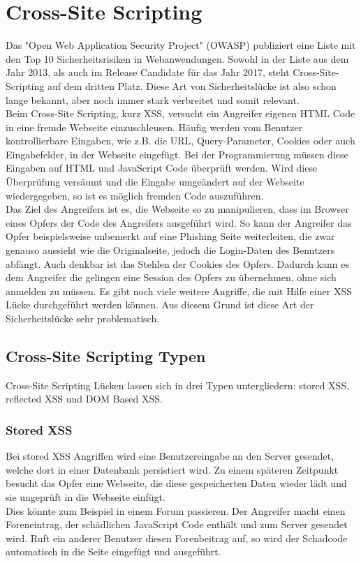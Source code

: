 \section{Cross-Site Scripting}
Das "Open Web Application Security Project" (OWASP) publiziert eine Liste mit den Top 10 Sicherheitsrisiken in Webanwendungen. Sowohl in der Liste aus dem Jahr 2013, als auch im Release Candidate für das Jahr 2017, steht Cross-Site-Scripting auf dem dritten Platz. Diese Art von Sicherheitslücke ist also schon lange bekannt, aber noch immer stark verbreitet und somit relevant. \\
Beim Cross-Site Scripting, kurz XSS, versucht ein Angreifer eigenen HTML Code in eine fremde Webseite einzuschleusen. Häufig werden vom Benutzer kontrollierbare Eingaben, wie z.B. die URL, Query-Parameter, Cookies oder auch Eingabefelder, in der Webseite eingefügt. Bei der Programmierung müssen diese Eingaben auf HTML und JavaScript Code überprüft werden. Wird diese Überprüfung versäumt und die Eingabe umgeändert auf der Webseite wiedergegeben, so ist es möglich fremden Code auszuführen. \\
Das Ziel des Angreifers ist es, die Webseite so zu manipulieren, dass im Browser eines Opfers der Code des Angreifers ausgeführt wird. So kann der Angreifer das Opfer beispielsweise unbemerkt auf eine Phishing Seite weiterleiten, die zwar genauso aussieht wie die Originalseite, jedoch die Login-Daten des Benutzers abfängt. Auch denkbar ist das Stehlen der Cookies des Opfers. Dadurch kann es dem Angreifer die gelingen eine Session des Opfers zu übernehmen, ohne sich anmelden zu müssen. Es gibt noch viele weitere Angriffe, die mit Hilfe einer XSS Lücke durchgeführt werden können. Aus diesem Grund ist diese Art der Sicherheitslücke sehr problematisch.
\subsection{Cross-Site Scripting Typen}
Cross-Site Scripting Lücken lassen sich in drei Typen untergliedern: stored XSS, reflected XSS und DOM Based XSS.
\subsubsection{Stored XSS}
Bei stored XSS Angriffen wird eine Benutzereingabe an den Server gesendet, welche dort in einer Datenbank persistiert wird. Zu einem späteren Zeitpunkt besucht das Opfer eine Webseite, die diese gespeicherten Daten wieder lädt und sie ungeprüft in die Webseite einfügt. \\
Dies könnte zum Beispiel in einem Forum passieren. Der Angreifer macht einen Foreneintrag, der schädlichen JavaScript Code enthält und zum Server gesendet wird. Ruft ein anderer Benutzer diesen Forenbeitrag auf, so wird der Schadcode automatisch in die Seite eingefügt und ausgeführt. 
